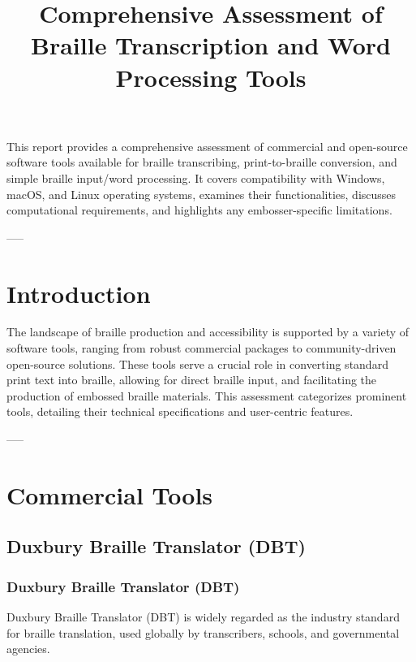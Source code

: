 \title{Comprehensive Assessment of Braille Transcription and Word Processing Tools}
\label{chap:braille-transcription-tools}

This report provides a comprehensive assessment of commercial and open-source software tools available for braille transcribing, print-to-braille conversion, and simple braille input/word processing. It covers compatibility with Windows, macOS, and Linux operating systems, examines their functionalities, discusses computational requirements, and highlights any embosser-specific limitations.

-----

\section{Introduction}
\label{sec:intro}
The landscape of braille production and accessibility is supported by a variety of software tools, ranging from robust commercial packages to community-driven open-source solutions. These tools serve a crucial role in converting standard print text into braille, allowing for direct braille input, and facilitating the production of embossed braille materials. This assessment categorizes prominent tools, detailing their technical specifications and user-centric features.

-----

\section{Commercial Tools}
\label{sec:commercial-tools}

\subsection{Duxbury Braille Translator (DBT)}
\label{subsec:dbt}
\subsubsection{Duxbury Braille Translator (DBT)}
Duxbury Braille Translator (DBT) is widely regarded as the industry standard for braille translation, used globally by transcribers, schools, and governmental agencies.

